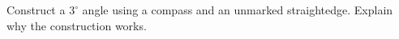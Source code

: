Construct a $3^\circ$ angle using a compass and an unmarked straightedge. Explain why the construction works.
